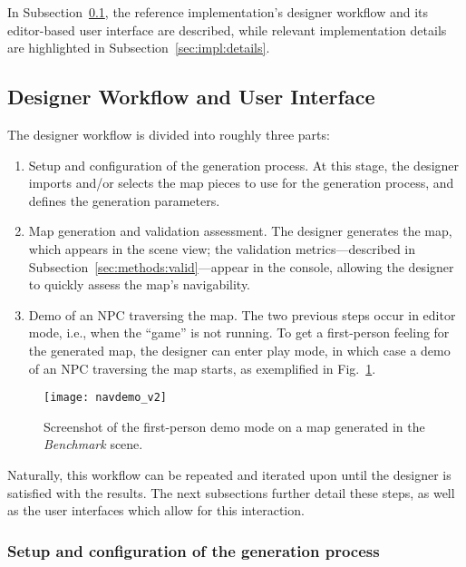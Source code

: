 \documentclass[journal]{IEEEtran}
\begin{document}
In Subsection~\ref{sec:impl:workflow}, the reference implementation's designer workflow and
its editor-based user interface are described, while relevant implementation details are
highlighted in Subsection~\ref{sec:impl:details}.

\subsection{Designer Workflow and User Interface}
\label{sec:impl:workflow}

The designer workflow is divided into roughly three parts:

\begin{enumerate}
    \item Setup and configuration of the generation process. At this stage, the designer imports
        and/or selects the map pieces to use for the generation process, and defines the generation
        parameters.
    \item Map generation and validation assessment. The designer generates the map, which
        appears in the scene view; the validation metrics---described in
        Subsection~\ref{sec:methods:valid}---appear in the console, allowing the designer
        to quickly assess the map's navigability.
    \item Demo of an NPC traversing the map. The two previous steps occur in editor mode,
        i.e., when the ``game'' is not running. To get a first-person feeling for the
        generated map, the designer can enter play mode, in which case a demo of an NPC
        traversing the map starts, as exemplified in Fig.~\ref{fig:navdemo}.
\end{enumerate}

\begin{figure}[!t]
  \centering
  \texttt{[image: navdemo\_v2]}
  \caption{Screenshot of the first-person demo mode on a map generated in the \textit{Benchmark}
    scene.}
  \label{fig:navdemo}
\end{figure}

Naturally, this workflow can be repeated and iterated upon until the designer is satisfied
with the results. The next subsections further detail these steps, as well as the user
interfaces which allow for this interaction.

\subsubsection{Setup and configuration of the generation process}
\label{sec:impl:workflow:setup}
\end{document}
